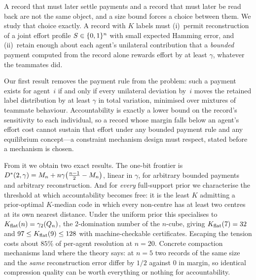 A record that must later settle payments and a record that must later be
read back are not the same object, and a size bound forces a choice between
them. We study that choice exactly. A record with $K$ labels must
(i)~permit reconstruction of a joint effort profile $S \in \{0,1\}^n$ with small
expected Hamming error, and (ii)~retain enough about each agent's unilateral
contribution that a \emph{bounded} payment computed from the record alone
rewards effort by at least $\gamma$, whatever the teammates did.

Our first result removes the payment rule from the problem: such a payment
exists for agent~$i$ if and only if every unilateral deviation by~$i$ moves the
retained label distribution by at least $\gamma$ in total variation, minimised
over mixtures of teammate behaviour. Accountability is exactly a lower bound on
the record's sensitivity to each individual, so a record whose margin falls below
an agent's effort cost cannot sustain that effort under any bounded payment rule
and any equilibrium concept---a constraint mechanism design must respect,
stated before a mechanism is chosen.

From it we obtain two exact results. The one-bit frontier is
$D^\ast(2,\gamma) = M_n + n\gamma\bigl(\tfrac{n-1}{2} - M_n\bigr)$, linear in
$\gamma$, for arbitrary bounded payments and arbitrary reconstruction. And for
\emph{every} full-support prior we characterise the threshold at which
accountability becomes free: it is the least $K$ admitting a prior-optimal
$K$-median code in which every non-centre has at least two centres at its own
nearest distance. Under the uniform prior this specialises to
$K_{\mathrm{flat}}(n) = \gamma_2(Q_n)$, the $2$-domination number of the $n$-cube, giving
$K_{\mathrm{flat}}(7) = 32$ and $97 \le K_{\mathrm{flat}}(9) \le 128$ with machine-checkable
certificates. Escaping the tension costs about $85\%$ of per-agent resolution at
$n = 20$. Concrete compaction mechanisms land where the theory says: at $n=5$ two
records of the same size and the \emph{same} reconstruction error differ by
$1/2$ against $0$ in margin, so identical compression quality can be worth
everything or nothing for accountability.

